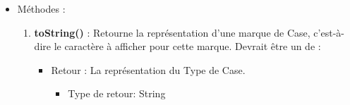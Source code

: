 \begin{itemize}
\item Méthodes : 

  \begin{enumerate}
    
  \item {\bf toString() }: Retourne la représentation d'une marque de Case, c'est-à-dire le caractère à afficher pour cette marque. Devrait être un de  : 
    
    \begin{itemize}
    \item Retour : La représentation du Type de Case.
      \begin{itemize}
      \item Type de retour: String
      \end{itemize}
    \end{itemize}
  \end{enumerate}
\end{itemize}
